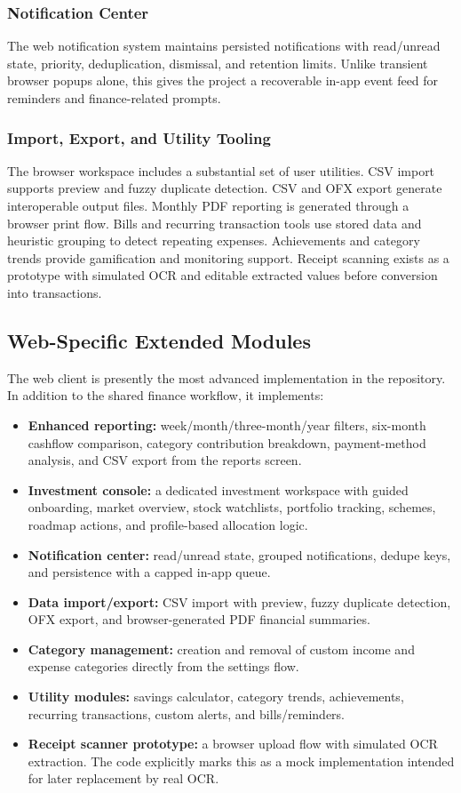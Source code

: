 \documentclass[conference]{IEEEtran}
\begin{document}
\subsubsection{Notification Center}
The web notification system maintains persisted notifications with read/unread state, priority, deduplication, dismissal, and retention limits. Unlike transient browser popups alone, this gives the project a recoverable in-app event feed for reminders and finance-related prompts.

\subsubsection{Import, Export, and Utility Tooling}
The browser workspace includes a substantial set of user utilities. CSV import supports preview and fuzzy duplicate detection. CSV and OFX export generate interoperable output files. Monthly PDF reporting is generated through a browser print flow. Bills and recurring transaction tools use stored data and heuristic grouping to detect repeating expenses. Achievements and category trends provide gamification and monitoring support. Receipt scanning exists as a prototype with simulated OCR and editable extracted values before conversion into transactions.

\subsection{Web-Specific Extended Modules}
The web client is presently the most advanced implementation in the repository. In addition to the shared finance workflow, it implements:
\begin{itemize}
\item \textbf{Enhanced reporting:} week/month/three-month/year filters, six-month cashflow comparison, category contribution breakdown, payment-method analysis, and CSV export from the reports screen.
\item \textbf{Investment console:} a dedicated investment workspace with guided onboarding, market overview, stock watchlists, portfolio tracking, schemes, roadmap actions, and profile-based allocation logic.
\item \textbf{Notification center:} read/unread state, grouped notifications, dedupe keys, and persistence with a capped in-app queue.
\item \textbf{Data import/export:} CSV import with preview, fuzzy duplicate detection, OFX export, and browser-generated PDF financial summaries.
\item \textbf{Category management:} creation and removal of custom income and expense categories directly from the settings flow.
\item \textbf{Utility modules:} savings calculator, category trends, achievements, recurring transactions, custom alerts, and bills/reminders.
\item \textbf{Receipt scanner prototype:} a browser upload flow with simulated OCR extraction. The code explicitly marks this as a mock implementation intended for later replacement by real OCR.
\end{itemize}
\end{document}
